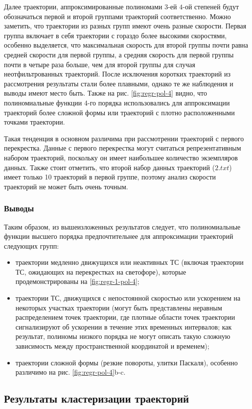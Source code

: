 Далее траектории, аппроксимированные полиномами $3$-ей $4$-ой степеней будут обозначаться первой и второй группами траекторий соответственно. Можно заметить, что траектории из разных групп имеют очень разные скорости. Первая группа включает в себя траектории с гораздо более высокими скоростями, особенно выделяется, что максимальная скорость для второй группы почти равна средней скорости для первой группы, а средняя скорость для первой группы почти в четыре раза больше, чем для второй группы для случая неотфильтрованных траекторий. После исключения коротких траекторий из рассмотрения результаты стали более плавными, однако те же наблюдения и выводы имеют место быть. Также на рис. \ref{fig:regr-pol-4} видно, что полиномиальные функции 4-го порядка использовались для аппроксимации траекторий более сложной формы или траекторий с плотно расположенными точками траектории.

Такая тенденция в основном различима при рассмотрении траекторий с первого перекрестка. Данные с первого перекрестка могут считаться репрезентативным набором траекторий, поскольку он имеет наибольшее количество экземпляров данных. Также стоит отметить, что второй набор данных траекторий ($2.txt$) имеет только 10 траекторий в первой группе, поэтому анализ скорости траекторий не может быть очень точным.

\subsubsection{Выводы}

Таким образом, из вышеизложенных результатов следует, что полиномиальные функции высшего порядка предпочтительнее для аппроксимации траекторий следующих групп:

\begin{itemize}
	\item траектории медленно движущихся или неактивных ТС (включая траектории ТС, ожидающих на перекрестках на светофоре), которые продемонстрированы на \ref{fig:regr-1-pol-4};
	\item траектории ТС, движущихся с непостоянной скоростью или ускорением на некоторых участках траектории (могут быть представлены неравным распределением точек траектории, где плотные области точек траектории сигнализируют об ускорении в течение этих временных интервалов; как результат, полиномы низкого порядка не могут описать такую сложную зависимость между пространственной координатой и временем);
	\item траектории сложной формы (резкие повороты, улитки Паскаля), особенно различимо на рис. \ref{fig:regr-pol-4}b-c.
\end{itemize}

\subsection{Результаты кластеризации траекторий}